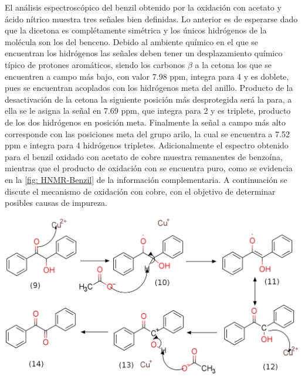 \documentclass[fleqn,10pt]{SelfArx}
\begin{document}
El an\'alisis espectrosc\'opico del benzil obtenido por la oxidaci\'on con acetato y \'acido n\'itrico muestra tres se\~nales bien definidas. Lo anterior es de esperarse dado que la dicetona es compl\'etamente sim\'etrica y los \'unicos hidr\'ogenos de la mol\'ecula son los del benceno. Debido al ambiente qu\'imico en el que se encuentran los hidr\'ogenos las señales deben tener un desplazamiento qu\'imico t\'ipico de protones arom\'aticos, siendo los carbonos $\beta$ a la cetona los que se encuentren a campo m\'as bajo, con valor 7.98 ppm, integra para 4 y es doblete, pues se encuentran acoplados con los hidr\'ogenos meta del anillo. Producto de la desactivaci\'on de la cetona la siguiente posici\'on m\'as desprotegida ser\'a la para, a ella se le asigna la se\~nal en 7.69 ppm, que integra para 2 y es triplete, producto de los dos hidr\'ogenos en posici\'on meta. Finalmente la se\~nal a campo m\'as alto corresponde con las posiciones meta del grupo arilo, la cual se encuentra a 7.52 ppm e integra para 4 hidr\'ogenos tripletes. Adicionalmente el espectro obtenido para el benzil oxidado con acetato de cobre muestra remanentes de benzo\'ina, mientras que el producto de oxidaci\'on con  se encuentra puro, como se evidencia en la \autoref{fig: HNMR-Benzil} de la informaci\'on complementaria. A continuaci\'on se discute el mecanismo de oxidaci\'on con cobre, con el objetivo de determinar posibles causas de impureza. 
\begin{scheme}[h]
	\centering
	\caption{Mecanismo de condensaci\'on oxidaci\'on de la benzo\'ina por acetato de cobre \cite{wigal2000}.}
	\includegraphics[width=\linewidth]{structures/mechanism-oxidationCu.png}
\end{scheme}
\end{document}
